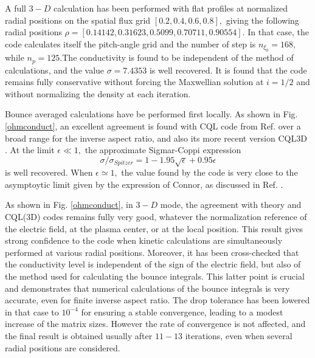 A full $3-D$ calculation has been performed with flat profiles at normalized
radial positions on the spatial flux grid $\left[ 0.2,0.4,0.6,0.8\right] ,$
giving the following radial positions $\rho =\left[
0.14142,0.31623,0.5099,0.70711,0.90554\right] $. In that case, the code
calculates itself the pitch-angle grid and the number of step is $n_{\xi
_{0}}=168,$ while $n_{p}=125.$The conductivity is found to be independent of
the method of calculations, and the value $\sigma =7.4353$ is well
recovered. It is found that the code remains fully conservative
without forcing the Maxwellian solution at $i=1/2$ and without normalizing
the density at each iteration.

Bounce averaged calculations have be performed first locally. As shown in
Fig. \ref{ohmconduct}, an excellent agreement is found with CQL code from
Ref. \cite{kil86} over a broad range for the inverse aspect ratio, and also
its more recent version CQL3D \cite{har93c1_IAEA}. At the limit $\epsilon
\ll 1,$ the approximate Sigmar-Coppi expression
\begin{equation}
\sigma /\sigma _{Spitzer}=1-1.95\sqrt{\epsilon }+0.95\epsilon
\end{equation}
is well recovered. When $\epsilon \simeq 1,$ the value found by the code is
very close to the asymptoytic limit given by the expression of Connor, as
discussed in Ref. \cite{kil86}.


As shown in Fig. \ref{ohmconduct}, in $3-D$ mode, the agreement with theory
and CQL(3D) codes remains fully very good, whatever the normalization
reference of the electric field, at the plasma center, or at the local
position. This result gives strong confidence to the code when kinetic
calculations are simultaneously performed at various radial positions.
Moreover, it has been cross-checked that the conductivity level is
independent of the sign of the electric field, but also of the method used
for calculating the bounce integrals. This latter point is crucial and
demonstrates that numerical calculations of the bounce integrals is very
accurate, even for finite inverse aspect ratio. The drop tolerance has been
lowered in that case to $10^{-4}$ for ensuring a stable convergence, leading
to a modest increase of the matrix sizes. However the rate of convergence is
not affected, and the final result is obtained usually after $11-13$
iterations, even when several radial positions are considered.
